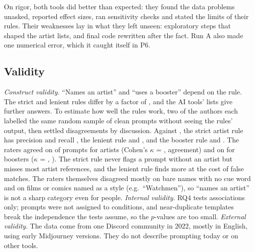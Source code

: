 \documentclass[conference]{IEEEtran}
\begin{document}
On rigor, both tools did better than expected: they found the data
problems unasked, reported effect sizes, ran sensitivity checks and stated
the limits of their rules. Their weaknesses lay in what they left unseen:
exploratory steps that shaped the artist lists, and final code rewritten
after the fact. Run A also made one numerical error, which it caught
itself in P6.

\subsection{Validity}
\textit{Construct validity.} ``Names an artist'' and ``uses a booster''
depend on the rule. The strict and lenient rules differ by a factor of
\ArtistRuleRatio, and the AI tools' lists give further answers. To estimate how well the rules
work, two of the authors each labelled the same random sample of \ValN{}
clean prompts without seeing the rules' output, then settled
disagreements by discussion. Against \ValReference, the
strict artist rule has precision \ValPrecStrict{} and recall
\ValRecStrict{}, the lenient rule \ValPrecLenient{} and \ValRecLenient{},
and the booster rule \ValPrecBooster{} and \ValRecBooster{}. The raters
agreed on \ValAgreeArtist{} of \ValN{} prompts for artists (Cohen's
$\kappa$ = \ValKappaArtist, \ValKappaArtistWord{} agreement) and on
\ValAgreeBooster{} for boosters ($\kappa$ = \ValKappaBooster,
\ValKappaBoosterWord).
The strict rule never flags a prompt without an artist but misses most
artist references, and the lenient rule finds more at the cost of false
matches. The raters themselves disagreed mostly on bare names with no cue
word and on films or comics named as a style (e.g.\ ``Watchmen''), so
``names an artist'' is not a sharp category even for people. \textit{Internal validity.} RQ4 tests
associations only; prompts were not assigned to conditions, and
near-duplicate templates break the independence the tests assume, so the
$p$-values are too small. \textit{External validity.} The data come from
one Discord community in 2022, mostly in English, using early Midjourney
versions. They do not describe prompting today or on other tools.
\end{document}
